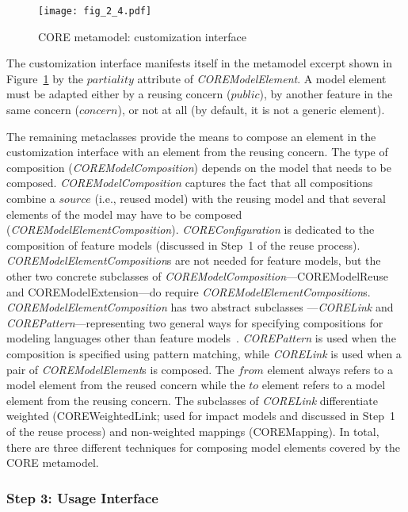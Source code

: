 \begin{figure}
	\centering
	\texttt{[image: fig\_2\_4.pdf]}
	\caption{CORE metamodel: customization interface}
	\label{fig:2.4}
\end{figure}

The customization interface manifests itself in the metamodel excerpt shown in Figure~\ref{fig:2.4} by the $partiality$ attribute of \textit{\cls COREModelElement}. A model element must be adapted either by a reusing concern ($public$), by another feature in the same concern ($concern$), or not at all (by default, it is not a generic element).

The remaining metaclasses provide the means to compose an element in the customization interface with an element from the reusing concern. The type of composition (\textit{\cls COREModelComposition}) depends on the model that needs to be composed. \textit{\cls COREModelComposition} captures the fact that all compositions combine a $source$ (i.e., reused model) with the reusing model and that several elements of the model may have to be composed (\textit{\cls COREModelElementComposition}). \textit{\cls COREConfiguration} is dedicated to the composition of feature models (discussed in Step~1 of the reuse process). \textit{\cls COREModelElementComposition}s are not needed for feature models, but the other two concrete subclasses of \textit{\cls COREModelComposition}---{\cls COREModelReuse} and {\cls COREModelExtension}---do require \textit{\cls COREModelElementComposition}s. \textit{\cls COREModelElementComposition} has two abstract subclasses ---\textit{\cls CORELink} and \textit{\cls COREPattern}---representing two general ways for specifying compositions for modeling languages other than feature models~\cite{mussbacher2012assessing, alam2013revising}. \textit{\cls COREPattern} is used when the composition is specified using pattern matching, while \textit{\cls CORELink} is used when a pair of \textit{\cls COREModelElement}s is composed. The $from$ element always refers to a model element from the reused concern while the $to$ element refers to a model element from the reusing concern. The subclasses of \textit{\cls CORELink} differentiate weighted ({\cls COREWeightedLink}; used for impact models and discussed in Step~1 of the reuse process) and non-weighted mappings ({\cls COREMapping}). In total, there are three different techniques for composing model elements covered by the CORE metamodel.

\subsubsection{Step 3: Usage Interface}

